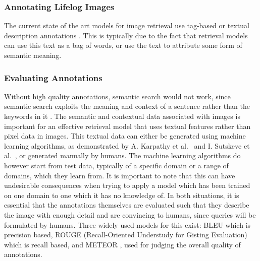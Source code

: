 \subsubsection{Annotating Lifelog Images}
The current state of the art models for image retrieval use tag-based or textual description annotations \citep{ali2010semantically}. This is typically due to the fact that retrieval models can use this text as a bag of words, or use the text to attribute some form of semantic meaning.

\subsubsection{Evaluating Annotations}
Without high quality annotations, semantic search would not work, since semantic search exploits the meaning and context of a sentence rather than the keywords in it \cite{ali2010semantically}. The semantic and contextual data associated with images is important for an effective retrieval model that uses textual features rather than pixel data in images. This textual data can either be generated using machine learning algorithms, as demonstrated by A. Karpathy et al.~\cite{karpathy2015deep} and  I. Sutskeve et al.~\cite{sutskever2011generating}, or generated manually by humans. The machine learning algorithms do however start from test data, typically of a specific domain or a range of domains, which they learn from. It is important to note that this can have undesirable consequences when trying to apply a model which has been trained on one domain to one which it has no knowledge of. In both situations, it is essential that the annotations themselves are evaluated such that they describe the image with enough detail and are convincing to humans, since queries will be formulated by humans. Three widely used models for this exist: BLEU \citep{papineni2002bleu} which is precision based, ROUGE (Recall-Oriented Understudy for Gisting Evaluation) \citep{lin2004rouge} which is recall based, and METEOR \citep{elliott2013image}, used for judging the overall quality of annotations.

